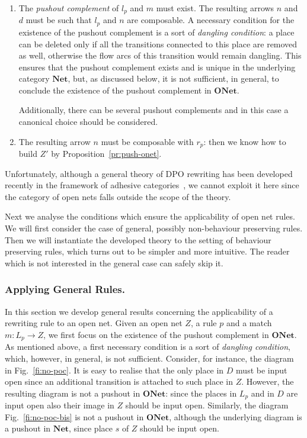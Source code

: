 \documentclass{LMCS}
\newcommand{\onet}{\ensuremath{\mathbf{ONet}}}
\newcommand{\net}{\ensuremath{\mathbf{Net}}}
\begin{document}
\begin{enumerate}[$\bullet$]
  
\item The \emph{pushout complement} of $l_p$ and $m$ must exist. The
  resulting arrows $n$ and $d$ must be such that $l_p$ and $n$ are
  composable.  A necessary condition for the existence of the pushout
  complement is a sort of \emph{dangling condition}: a place can be
  deleted only if all the transitions connected to this place are
  removed as well, otherwise the flow arcs of this transition would
  remain dangling. This ensures that the pushout complement exists and
  is unique in the underlying category $\net$, but, as discussed
  below, it is not sufficient, in general, to conclude the existence
  of the pushout complement in $\onet$.

  Additionally, there can be several pushout complements and in this case a
  canonical choice should be considered.

\item
  The resulting arrow  $n$ must be composable with $r_p$: then we know
  how to build $Z'$ by Proposition~\ref{pr:push-onet}.

\end{enumerate}

Unfortunately, although a general theory of DPO
rewriting has been developed recently in the framework of adhesive
categories~\cite{LS:AQC}, we cannot exploit it here
since the category of open nets falls outside the scope of the theory.

Next we analyse the conditions which ensure the applicability of open
net rules. We will first consider the case of general, possibly
non-behaviour preserving rules. Then we will instantiate the developed
theory to the setting of behaviour preserving rules, which turns out to
be simpler and more intuitive. The reader which is not interested in
the general case can safely skip it.

\subsubsection{Applying General Rules.}

In this section we develop general results concerning the
applicability of a rewriting rule to an open net. Given an open net
$Z$, a rule $p$ and a match $m : L_p \to Z$, we first focus on the
existence of the pushout complement in $\onet$.
As mentioned above, a first necessary condition is a sort of
\emph{dangling condition}, which, however, in general, is not
sufficient.
Consider, for instance, the diagram in Fig.~\ref{fi:no-poc}. It is
easy to realise that the only place in $D$ must be input open since an
additional transition is attached to such place in $Z$. However, the
resulting diagram is not a pushout in $\onet$: since the places in $L_p$
and in $D$ are input open also their image in $Z$ should be input
open.
Similarly, the diagram Fig.~\ref{fi:no-poc-bis} is not a pushout in
$\onet$, although the underlying diagram is a pushout in $\net$, since
place $s$ of $Z$ should be input open.
\end{document}
